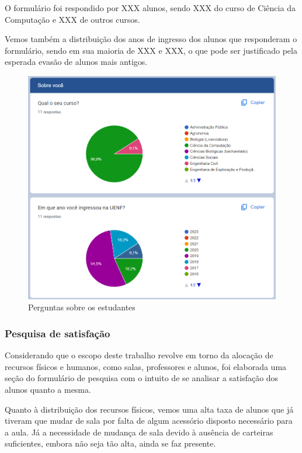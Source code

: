         O formulário foi respondido por XXX alunos, sendo XXX do curso de Ciência da Computação e XXX de outros cursos.

        Vemos também a distribuição dos anos de ingresso dos alunos que responderam o formulário, sendo em sua maioria de XXX e XXX, o que pode ser justificado pela esperada evasão de alunos mais antigos.

        \begin{figure}[htbp]\centering
            \caption{\label{fig:1_SobreVoce} Perguntas sobre os estudantes}
            \includegraphics[scale=0.8]{files/img/forms/1.0-SobreVoce.png}
        \end{figure} %

    \subsubsection{Pesquisa de satisfação} %

        Considerando que o escopo deste trabalho revolve em torno da alocação de recursos físicos e humanos, como salas, professores e alunos, foi elaborada uma seção do formulário de pesquisa com o intuito de se analisar a satisfação dos alunos quanto a mesma.

        Quanto à distribuição dos recursos físicos, vemos uma alta taxa de alunos que já tiveram que mudar de sala por falta de algum acessório disposto necessário para a aula. Já a necessidade de mudança de sala devido à ausência de carteiras suficientes, embora não seja tão alta, ainda se faz presente.

